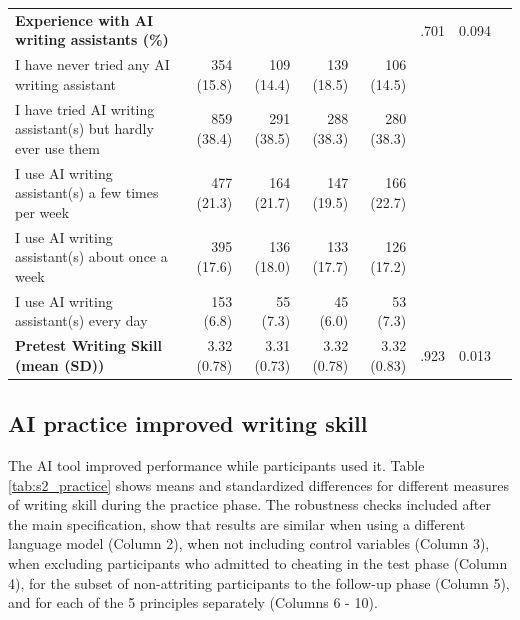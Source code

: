 \documentclass[11pt]{report}
\begin{document}
\begin{append}
\begin{table}[ht]
\begin{tabular}{lrrrrrrr}
\textbf{Experience with AI writing assistants (\%)} &  &   &   &   & .701   &  0.094 \\ 
   \hspace{1em}I have never tried any AI writing assistant &  354 (15.8)  &  109 (14.4)  &  139 (18.5)  &  106 (14.5)  &    &  \\ 
   \hspace{1em}I have tried AI writing assistant(s) but hardly ever use them &  859 (38.4)  &  291 (38.5)  &  288 (38.3)  &  280 (38.3)  &  &    \\ 
   \hspace{1em}I use AI writing assistant(s) a few times per week &  477 (21.3)  &  164 (21.7)  &  147 (19.5)  &  166 (22.7)  &  &    \\ 
   \hspace{1em}I use AI writing assistant(s) about once a week &  395 (17.6)  &  136 (18.0)  &  133 (17.7)  &  126 (17.2)  &  &    \\ 
   \hspace{1em}I use AI writing assistant(s) every day &  153 (6.8)  &   55 (7.3)  &   45 (6.0)  &   53 (7.3)  &  &    \\ 
\textbf{Pretest Writing Skill (mean (SD))} & 3.32 (0.78) & 3.31 (0.73) & 3.32 (0.78) & 3.32 (0.83) & .923 &    0.013 \\ 
\bottomrule
\end{tabular}
\end{table}
\subsection{AI practice improved writing skill}

The AI tool improved performance while participants used it. Table \ref{tab:s2_practice} shows means and standardized differences for different measures of writing skill during the practice phase. The robustness checks included after the main specification, show that results are similar when using a different language model (Column 2), when not including control variables (Column 3), when excluding participants who admitted to cheating in the test phase (Column 4), for the subset of non-attriting participants to the follow-up phase (Column 5), and for each of the 5 principles separately (Columns 6 - 10).


\end{append}
\end{document}

